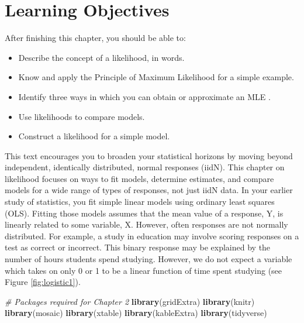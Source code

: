 \documentclass[
]{krantz}
\newenvironment{Shaded}{\begin{snugshade}}{\end{snugshade}}
\newcommand{\CommentTok}[1]{\textcolor[rgb]{0.37,0.37,0.37}{\textit{#1}}}
\newcommand{\KeywordTok}[1]{\textcolor[rgb]{0.27,0.27,0.27}{\textbf{#1}}}
\newcommand{\NormalTok}[1]{#1}
\providecommand{\tightlist}{%
  \setlength{\itemsep}{0pt}\setlength{\parskip}{0pt}}
\begin{document}
\hypertarget{learning-objectives-1}{%
\section{Learning Objectives}\label{learning-objectives-1}}

After finishing this chapter, you should be able to:

\begin{itemize}
\tightlist
\item
  Describe the concept of a likelihood, in words.
\item
  Know and apply the Principle of Maximum Likelihood for a simple example.
\item
  Identify three ways in which you can obtain or approximate an MLE .
\item
  Use likelihoods to compare models.
\item
  Construct a likelihood for a simple model.
\end{itemize}

This text encourages you to broaden your statistical horizons by moving beyond independent, identically distributed, normal responses (iidN). This chapter on likelihood focuses on ways to fit models, determine estimates, and compare models for a wide range of types of responses, not just iidN data. In your earlier study of statistics, you fit simple linear models using ordinary least squares (OLS). Fitting those models assumes that the mean value of a response, Y, is linearly related to some variable, X. However, often responses are not normally distributed. For example, a study in education may involve scoring responses on a test as correct or incorrect. This binary response may be explained by the number of hours students spend studying. However, we do not expect a variable which takes on only 0 or 1 to be a linear function of time spent studying (see Figure \ref{fig:logistic1}).

\begin{Shaded}
\begin{Highlighting}[]
\CommentTok{# Packages required for Chapter 2}
\KeywordTok{library}\NormalTok{(gridExtra)  }
\KeywordTok{library}\NormalTok{(knitr) }
\KeywordTok{library}\NormalTok{(mosaic)}
\KeywordTok{library}\NormalTok{(xtable)}
\KeywordTok{library}\NormalTok{(kableExtra)}
\KeywordTok{library}\NormalTok{(tidyverse) }
\end{Highlighting}
\end{Shaded}
\end{document}

